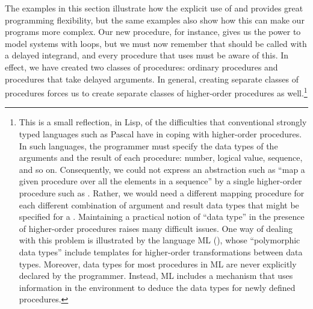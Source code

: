 The examples in this section illustrate how the explicit use of 
and  provides great programming flexibility, but the same examples
also show how this can make our programs more complex.  Our new 
procedure, for instance, gives us the power to model systems with loops, but we
must now remember that  should be called with a delayed
integrand, and every procedure that uses  must be aware of this.
In effect, we have created two classes of procedures: ordinary procedures and
procedures that take delayed arguments.  In general, creating separate classes
of procedures forces us to create separate classes of higher-order procedures
as well.\footnote{This is a small reflection, in Lisp, of the difficulties that
conventional strongly typed languages such as Pascal have in coping with
higher-order procedures.  In such languages, the programmer must specify the
data types of the arguments and the result of each procedure: number, logical
value, sequence, and so on.  Consequently, we could not express an abstraction
such as ``map a given procedure  over all the elements in a
sequence'' by a single higher-order procedure such as .
Rather, we would need a different mapping procedure for each different
combination of argument and result data types that might be specified for a
.  Maintaining a practical notion of ``data type'' in the presence
of higher-order procedures raises many difficult issues.  One way of dealing
with this problem is illustrated by the language ML (),
whose ``polymorphic data types'' include templates for
higher-order transformations between data types.  Moreover, data types for most
procedures in ML are never explicitly declared by the programmer.  Instead, ML
includes a  mechanism that uses information in the
environment to deduce the data types for newly defined procedures.}


